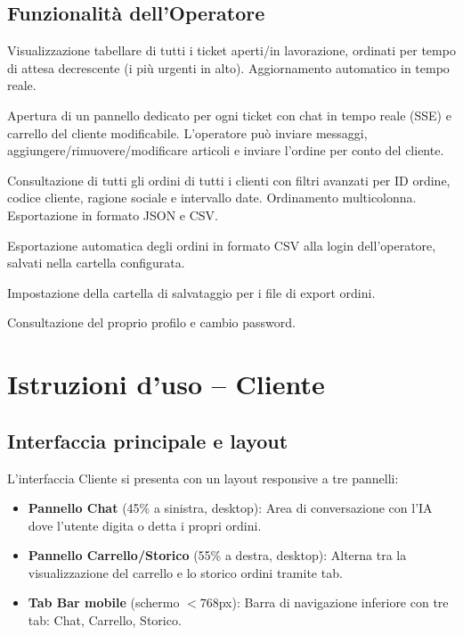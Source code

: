 \documentclass[a4paper, 11pt, oneside]{scrartcl}
\begin{document}
\subsection{Funzionalit\`a dell'Operatore}
\begin{description}[style=nextline, leftmargin=1.5cm]
    \item[\textbf{Dashboard ticket}] Visualizzazione tabellare di tutti i ticket aperti/in lavorazione, ordinati per tempo di attesa decrescente (i pi\`u urgenti in alto). Aggiornamento automatico in tempo reale.
    \item[\textbf{Gestione ticket}] Apertura di un pannello dedicato per ogni ticket con chat in tempo reale (SSE) e carrello del cliente modificabile. L'operatore pu\`o inviare messaggi, aggiungere/rimuovere/modificare articoli e inviare l'ordine per conto del cliente.
    \item[\textbf{Storico ordini globale}] Consultazione di tutti gli ordini di tutti i clienti con filtri avanzati per ID ordine, codice cliente, ragione sociale e intervallo date. Ordinamento multicolonna. Esportazione in formato JSON e CSV.
    \item[\textbf{Export batch}] Esportazione automatica degli ordini in formato CSV alla login dell'operatore, salvati nella cartella configurata.
    \item[\textbf{Configurazione export}] Impostazione della cartella di salvataggio per i file di export ordini.
    \item[\textbf{Area personale}] Consultazione del proprio profilo e cambio password.
\end{description}

\newpage
\section{Istruzioni d'uso -- Cliente}

\subsection{Interfaccia principale e layout}

L'interfaccia Cliente si presenta con un layout responsive a tre pannelli:

\begin{itemize}
    \item \textbf{Pannello Chat} (45\% a sinistra, desktop): Area di conversazione con l'IA dove l'utente digita o detta i propri ordini.
    \item \textbf{Pannello Carrello/Storico} (55\% a destra, desktop): Alterna tra la visualizzazione del carrello e lo storico ordini tramite tab.
    \item \textbf{Tab Bar mobile} (schermo $< 768$px): Barra di navigazione inferiore con tre tab: Chat, Carrello, Storico.
\end{itemize}
\end{document}
